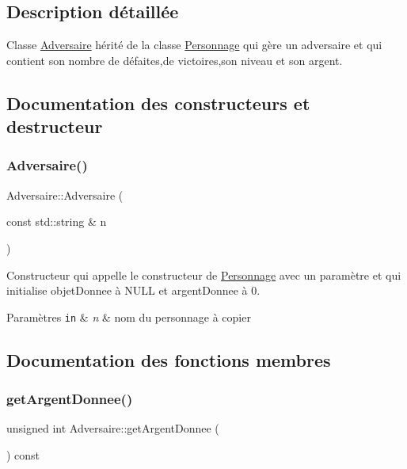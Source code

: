 \subsection{Description détaillée}
Classe \hyperlink{class_adversaire}{Adversaire} hérité de la classe \hyperlink{class_personnage}{Personnage} qui gère un adversaire et qui contient son nombre de défaites,de victoires,son niveau et son argent. 

\subsection{Documentation des constructeurs et destructeur}
\mbox{\label{class_adversaire_a7db6fc6be761ea8aef77e6b4e582dcf0}} 
\subsubsection{\texorpdfstring{Adversaire()}{Adversaire()}}
{\footnotesize\ttfamily Adversaire\+::\+Adversaire (\begin{DoxyParamCaption}\item[{const std\+::string \&}]{n }\end{DoxyParamCaption})}



Constructeur qui appelle le constructeur de \hyperlink{class_personnage}{Personnage} avec un paramètre et qui initialise objet\+Donnee à N\+U\+LL et argent\+Donnee à 0. 


\begin{DoxyParams}[1]{Paramètres}
\mbox{\tt in}  & {\em n} & nom du personnage à copier \\
\hline
\end{DoxyParams}


\subsection{Documentation des fonctions membres}
\mbox{\label{class_adversaire_a8b95db33d9233f0edcc2d870cc2242c3}} 
\subsubsection{\texorpdfstring{get\+Argent\+Donnee()}{getArgentDonnee()}}
{\footnotesize\ttfamily unsigned int Adversaire\+::get\+Argent\+Donnee (\begin{DoxyParamCaption}{ }\end{DoxyParamCaption}) const}



